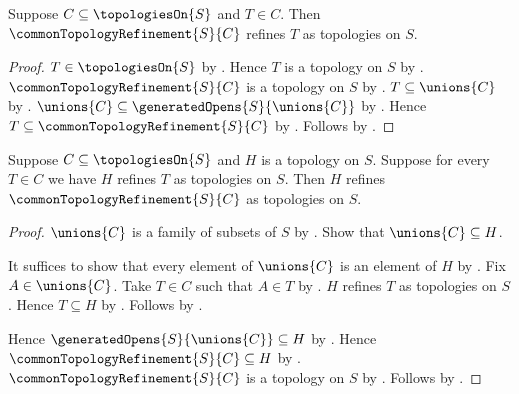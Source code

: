 \begin{theorem}\label{common_topology_refinement_refines_members}
    Suppose $C\subseteq\topologiesOn{S}$ and $T\in C$.
    Then $\commonTopologyRefinement{S}{C}$ refines $T$
        as topologies on $S$.
\end{theorem}
\begin{proof}
    $T\in\topologiesOn{S}$ by .
    Hence $T$ is a topology on $S$ by
        .
    $\commonTopologyRefinement{S}{C}$ is a topology on $S$ by
        .
    $T\subseteq\unions{C}$ by .
    $\unions{C}\subseteq\generatedOpens{S}{\unions{C}}$ by
        .
    Hence $T\subseteq\commonTopologyRefinement{S}{C}$ by
        .
    Follows by .
\end{proof}

\begin{theorem}\label{common_topology_refinement_least}
    Suppose $C\subseteq\topologiesOn{S}$ and $H$ is a topology on $S$.
    Suppose for every $T\in C$ we have
        $H$ refines $T$ as topologies on $S$.
    Then $H$ refines $\commonTopologyRefinement{S}{C}$
        as topologies on $S$.
\end{theorem}
\begin{proof}
    $\unions{C}$ is a family of subsets of $S$ by
        .
    Show that $\unions{C}\subseteq H$.
    \begin{subproof}
        It suffices to show that every element of $\unions{C}$ is an
            element of $H$ by .
        Fix $A\in\unions{C}$.
        Take $T\in C$ such that $A\in T$ by .
        $H$ refines $T$ as topologies on $S$.
        Hence $T\subseteq H$ by .
        Follows by .
    \end{subproof}
    Hence $\generatedOpens{S}{\unions{C}}\subseteq H$ by
        .
    Hence $\commonTopologyRefinement{S}{C}\subseteq H$ by
        .
    $\commonTopologyRefinement{S}{C}$ is a topology on $S$ by
        .
    Follows by .
\end{proof}

